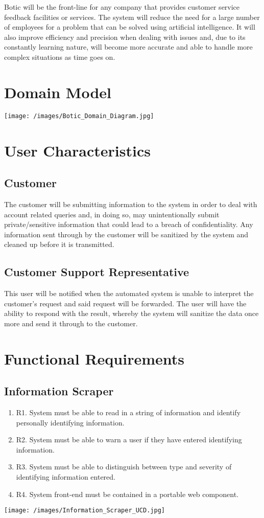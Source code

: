 \documentclass[11pt]{article}
\begin{document}
\begin{flushleft}
Botic will be the front-line for any company that provides customer service feedback facilities or services. The system will reduce the need for a large number of employees for a problem that can be solved using artificial intelligence. It will also improve efficiency and precision when dealing with issues and, due to its constantly learning nature, will become more accurate and able to handle more complex situations as time goes on.\\[0.5cm]
\end{flushleft}

\section{Domain Model}

 \texttt{[image: /images/Botic\_Domain\_Diagram.jpg]}
 
\section{User Characteristics}
\subsection{Customer}
The customer will be submitting information to the system in order to deal with account related queries and, in doing so, may unintentionally submit private/sensitive information that could lead to a breach of confidentiality. Any information sent through by the customer will be sanitized by the system and cleaned up before it is transmitted.
\subsection{Customer Support Representative}
This user will be notified when the automated system is unable to interpret the customer's request and said request will be forwarded. The user will have the ability to respond with the result, whereby the system will sanitize the data once more and send it through to the customer.

\section{Functional Requirements}
\subsection{Information Scraper}
\begin{enumerate}
    \item R1. System must be able to read in a string of information and identify personally identifying information.
    \item R2. System must be able to warn a user if they have entered identifying information. 
    \item R3. System must be able to distinguish between type and severity of identifying information entered.
    \item R4. System front-end must be contained in a portable web component.
\end{enumerate}
 \texttt{[image: /images/Information\_Scraper\_UCD.jpg]}
\end{document}
